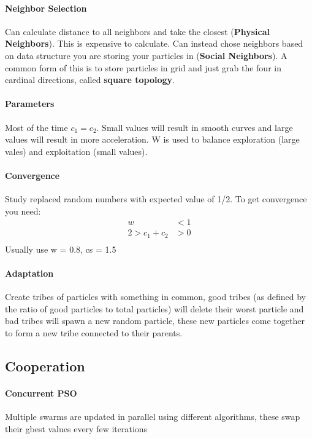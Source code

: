 \documentclass[12pt]{article}
\begin{document}
\paragraph{Neighbor Selection} 
\label{par:neighbor_selection}
Can calculate distance to all neighbors and take the closest (\textbf{Physical Neighbors}). This is expensive to calculate. Can instead chose neighbors based on data structure you are storing your particles in (\textbf{Social Neighbors}). A common form of this is to store particles in grid and just grab the four in cardinal directions, called \textbf{square topology}.

\paragraph{Parameters} 
\label{par:parameters}
Most of the time $c_1 = c_2$. Small values will result in smooth curves and large values will result in more acceleration. W is used to balance exploration (large vales) and exploitation (small values). 

\paragraph{Convergence} 
\label{par:convergence}
Study replaced random numbers with expected value of 1/2. To get convergence you need:
\begin{align*}
	w &< 1 \\
	2 > c_1 + c_2 & > 0\\
\end{align*}
Usually use w = 0.8, cs = 1.5 

\paragraph{Adaptation} 
\label{par:adaptation}
Create tribes of particles with something in common, good tribes (as defined by the ratio of good particles to total particles) will delete their worst particle and bad tribes will spawn a new random particle, these new particles come together to form a new tribe connected to their parents.

\subsection*{Cooperation}
\label{sub:cooperation}
\paragraph{Concurrent PSO} 
\label{par:concurrent_pso}
Multiple swarms are updated in parallel using different algorithms, these swap their gbest values every few iterations
\end{document}
